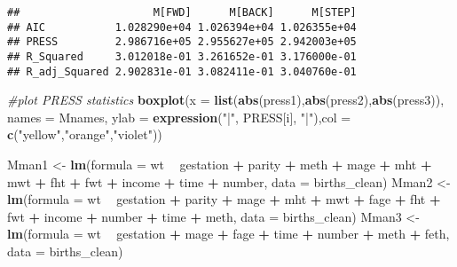 \documentclass[]{article}
\newenvironment{Shaded}{\begin{snugshade}}{\end{snugshade}}
\newcommand{\KeywordTok}[1]{\textcolor[rgb]{0.13,0.29,0.53}{\textbf{#1}}}
\newcommand{\DataTypeTok}[1]{\textcolor[rgb]{0.13,0.29,0.53}{#1}}
\newcommand{\StringTok}[1]{\textcolor[rgb]{0.31,0.60,0.02}{#1}}
\newcommand{\CommentTok}[1]{\textcolor[rgb]{0.56,0.35,0.01}{\textit{#1}}}
\newcommand{\OperatorTok}[1]{\textcolor[rgb]{0.81,0.36,0.00}{\textbf{#1}}}
\newcommand{\NormalTok}[1]{#1}
\begin{document}
\begin{verbatim}
##                     M[FWD]      M[BACK]      M[STEP]
## AIC           1.028290e+04 1.026394e+04 1.026355e+04
## PRESS         2.986716e+05 2.955627e+05 2.942003e+05
## R_Squared     3.012018e-01 3.261652e-01 3.176000e-01
## R_adj_Squared 2.902831e-01 3.082411e-01 3.040760e-01
\end{verbatim}

\begin{Shaded}
\begin{Highlighting}[]
\CommentTok{#plot PRESS statistics}
\KeywordTok{boxplot}\NormalTok{(}\DataTypeTok{x =} \KeywordTok{list}\NormalTok{(}\KeywordTok{abs}\NormalTok{(press1),}\KeywordTok{abs}\NormalTok{(press2),}\KeywordTok{abs}\NormalTok{(press3)), }\DataTypeTok{names =}\NormalTok{ Mnames,}
        \DataTypeTok{ylab =} \KeywordTok{expression}\NormalTok{(}\StringTok{"|"}\NormalTok{, PRESS[i], }\StringTok{"|"}\NormalTok{),}\DataTypeTok{col =} \KeywordTok{c}\NormalTok{(}\StringTok{"yellow"}\NormalTok{,}\StringTok{"orange"}\NormalTok{,}\StringTok{"violet"}\NormalTok{))}

\NormalTok{Mman1 <-}\StringTok{ }\KeywordTok{lm}\NormalTok{(}\DataTypeTok{formula =}\NormalTok{ wt }\OperatorTok{~}\StringTok{ }\NormalTok{gestation }\OperatorTok{+}\StringTok{ }\NormalTok{parity }\OperatorTok{+}\StringTok{ }\NormalTok{meth }\OperatorTok{+}\StringTok{ }\NormalTok{mage }\OperatorTok{+}\StringTok{ }\NormalTok{mht }\OperatorTok{+}\StringTok{ }\NormalTok{mwt }\OperatorTok{+}\StringTok{ }
\StringTok{    }\NormalTok{fht }\OperatorTok{+}\StringTok{ }\NormalTok{fwt }\OperatorTok{+}\StringTok{ }\NormalTok{income }\OperatorTok{+}\StringTok{ }\NormalTok{time }\OperatorTok{+}\StringTok{ }\NormalTok{number,  }\DataTypeTok{data =}\NormalTok{ births_clean)}
\NormalTok{Mman2 <-}\StringTok{ }\KeywordTok{lm}\NormalTok{(}\DataTypeTok{formula =}\NormalTok{ wt }\OperatorTok{~}\StringTok{ }\NormalTok{gestation }\OperatorTok{+}\StringTok{ }\NormalTok{parity }\OperatorTok{+}\StringTok{ }\NormalTok{mage }\OperatorTok{+}\StringTok{ }\NormalTok{mht }\OperatorTok{+}\StringTok{ }\NormalTok{mwt }\OperatorTok{+}\StringTok{ }\NormalTok{fage }\OperatorTok{+}\StringTok{ }
\StringTok{    }\NormalTok{fht }\OperatorTok{+}\StringTok{ }\NormalTok{fwt }\OperatorTok{+}\StringTok{ }\NormalTok{income }\OperatorTok{+}\StringTok{ }\NormalTok{number }\OperatorTok{+}\StringTok{ }\NormalTok{time }\OperatorTok{+}\StringTok{ }\NormalTok{meth,  }\DataTypeTok{data =}\NormalTok{ births_clean)}
\NormalTok{Mman3 <-}\StringTok{ }\KeywordTok{lm}\NormalTok{(}\DataTypeTok{formula =}\NormalTok{ wt }\OperatorTok{~}\StringTok{ }\NormalTok{gestation }\OperatorTok{+}\StringTok{ }\NormalTok{mage }\OperatorTok{+}\StringTok{ }\NormalTok{fage  }\OperatorTok{+}\StringTok{ }\NormalTok{time }\OperatorTok{+}\StringTok{ }\NormalTok{number }\OperatorTok{+}\StringTok{ }\NormalTok{meth }\OperatorTok{+}\StringTok{ }\NormalTok{feth, }
            \DataTypeTok{data =}\NormalTok{ births_clean)}


\end{Highlighting}
\end{Shaded}
\end{document}
